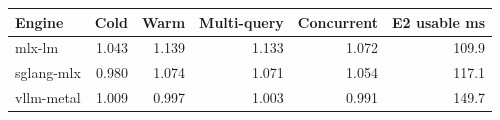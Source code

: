 \begin{tabular}{lrrrrr}
\toprule
Engine & Cold & Warm & Multi-query & Concurrent & E2 usable ms \\
\midrule
mlx-lm & 1.043 & 1.139 & 1.133 & 1.072 & 109.9 \\
sglang-mlx & 0.980 & 1.074 & 1.071 & 1.054 & 117.1 \\
vllm-metal & 1.009 & 0.997 & 1.003 & 0.991 & 149.7 \\
\bottomrule
\end{tabular}
